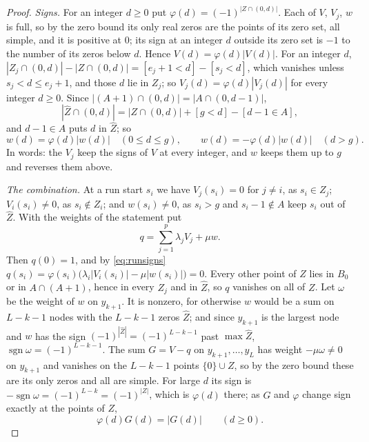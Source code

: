 \documentclass[11pt]{article}
\theoremstyle{definition}
\theoremstyle{plain}
\DeclareMathOperator{\sgn}{sgn}
\begin{document}
\begin{proof}
\emph{Signs.}  For an integer $d\ge0$ put $\varphi(d)=(-1)^{|Z\cap(0,d)|}$.
Each of $V$, $V_j$, $w$ is full, so by the zero bound its only real zeros
are the points of its zero set, all simple, and it is positive at $0$; its sign at an
integer $d$ outside its zero set is $-1$ to the number of its zeros below $d$.
Hence $V(d)=\varphi(d)|V(d)|$.  For an integer $d$,
$|Z_j\cap(0,d)|-|Z\cap(0,d)|=[e_j+1<d]-[s_j<d]$, which vanishes unless
$s_j<d\le e_j+1$, and those $d$ lie in $Z_j$; so $V_j(d)=\varphi(d)|V_j(d)|$
for every integer $d\ge0$.  Since $|(A+1)\cap(0,d)|=|A\cap(0,d-1)|$,
\[
  |\widehat Z\cap(0,d)|=|Z\cap(0,d)|+[g<d]-[d-1\in A],
\]
and $d-1\in A$ puts $d$ in $\widehat Z$; so
\begin{equation}\label{eq:runsigns}
  w(d)=\varphi(d)|w(d)|\quad(0\le d\le g),\qquad
  w(d)=-\varphi(d)|w(d)|\quad(d>g).
\end{equation}
In words: the $V_j$ keep the signs of $V$ at every integer, and $w$ keeps
them up to $g$ and reverses them above.

\emph{The combination.}  At a run start $s_i$ we have $V_j(s_i)=0$ for
$j\ne i$, as $s_i\in Z_j$; $V_i(s_i)\ne0$, as $s_i\notin Z_i$; and
$w(s_i)\ne0$, as $s_i>g$ and $s_i-1\notin A$ keep $s_i$ out of $\widehat Z$.  With the weights of the statement put
\[
  q=\sum_{j=1}^p\lambda_jV_j+\mu w .
\]
Then $q(0)=1$, and by \eqref{eq:runsigns}
$q(s_i)=\varphi(s_i)\bigl(\lambda_i|V_i(s_i)|-\mu|w(s_i)|\bigr)=0$.  Every
other point of $Z$ lies in $B_0$ or in $A\cap(A+1)$, hence in every $Z_j$ and
in $\widehat Z$, so $q$ vanishes on all of $Z$.  Let $\omega$ be the weight of $w$ on
$y_{k+1}$.  It is nonzero, for otherwise $w$ would be a sum on $L-k-1$ nodes
with the $L-k-1$ zeros $\widehat Z$; and since $y_{k+1}$ is the largest node and $w$
has the sign $(-1)^{|\widehat Z|}=(-1)^{L-k-1}$ past $\max\widehat Z$,
$\sgn\omega=(-1)^{L-k-1}$.  The sum $G=V-q$ on $y_{k+1},\ldots,y_L$ has weight
$-\mu\omega\ne0$ on $y_{k+1}$ and vanishes on the $L-k-1$ points
$\{0\}\cup Z$, so by the zero bound these are its only zeros and all are
simple.  For large $d$ its sign is $-\sgn\omega=(-1)^{L-k}=(-1)^{|Z|}$, which
is $\varphi(d)$ there; as $G$ and $\varphi$ change sign exactly at the points
of $Z$,
\begin{equation}\label{eq:runG}
  \varphi(d)G(d)=|G(d)|\qquad(d\ge0).
\end{equation}


\end{proof}
\end{document}
